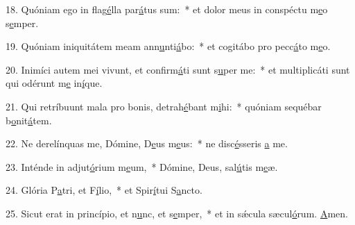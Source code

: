 18. Quóniam ego in flag\uline{é}lla par\uline{á}tus sum:~* et dolor meus in conspéctu m\uline{e}o s\uline{e}mper.\par 
19. Quóniam iniquitátem meam ann\uline{u}nti\uline{á}bo:~* et cogitábo pro pecc\uline{á}to m\uline{e}o.\par 
20. Inimíci autem mei vivunt, et confirm\uline{á}ti sunt s\uline{u}per me:~* et multiplicáti sunt qui odérunt m\uline{e} in\uline{í}que.\par 
21. Qui retríbuunt mala pro bonis, detrah\uline{é}bant m\uline{i}hi:~* quóniam sequébar b\uline{o}nit\uline{á}tem.\par 
22. Ne derelínquas me, Dómine, D\uline{e}us m\uline{e}us:~* ne disc\uline{é}sseris \uline{a} me.\par 
23. Inténde in adjut\uline{ó}rium m\uline{e}um,~* Dómine, Deus, sal\uline{ú}tis m\uline{e}æ.\par 
24. Glória P\uline{a}tri, et F\uline{í}lio,~* et Spir\uline{í}tui S\uline{a}ncto.\par 
25. Sicut erat in princípio, et n\uline{u}nc, et s\uline{e}mper,~* et in sǽcula sæcul\uline{ó}rum. \uline{A}men.\par 

